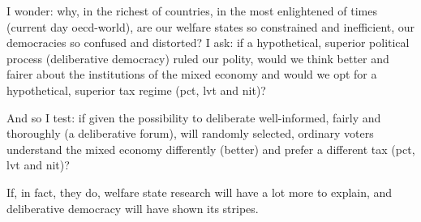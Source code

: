 I wonder:
why, in the richest of countries, in the most enlightened of times (current day \gls{oecd}-world), are our welfare states so constrained and inefficient, our democracies so confused and distorted?
I ask:
if a hypothetical, superior political process (deliberative democracy) ruled our polity, would we think better and fairer about the institutions of the mixed economy and would we opt for a hypothetical, superior tax regime (\gls{pct}, \gls{lvt} and \gls{nit})?

And so I test:
if given the possibility to deliberate well-informed, fairly and thoroughly (a deliberative forum), will randomly selected, ordinary voters understand the mixed economy differently (better) and prefer a different tax (\gls{pct}, \gls{lvt} and \gls{nit})?


If, in fact, they do, welfare state research will have a lot more to explain, and deliberative democracy will have shown its stripes.

%
